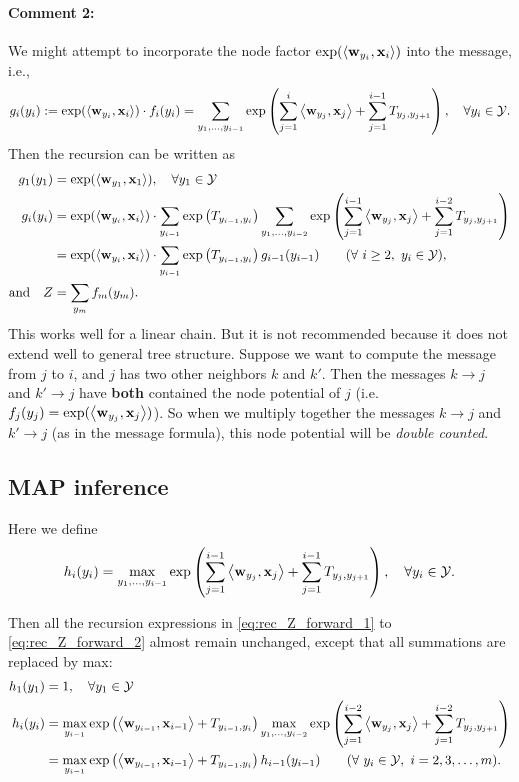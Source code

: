 \documentclass[11pt]{report}
\begin{document}
\paragraph{Comment 2:}
We might attempt to incorporate the node factor $\exp(\left\langle \mathbf{\boldsymbol{w}}_{y_i},\mathbf{\boldsymbol{x}}_i \right\rangle)$ into the message, i.e.,
\begin{align}
	g_i(y_i) := \exp(\left\langle \mathbf{\boldsymbol{w}}_{y_i},\mathbf{\boldsymbol{x}}_i \right\rangle) \cdot f_i(y_i) = \sum_{y_1, \ldots, y_{i-1}} \exp \left(\sum_{j=1}^{i} \left\langle \mathbf{\boldsymbol{w}}_{y_j},\mathbf{\boldsymbol{x}}_j \right\rangle + \sum_{j=1}^{i-1} T_{y_j, y_{j+1}}\right), \quad \forall y_i \in \mathcal{Y}.
\end{align}
Then the recursion can be written as
\begin{align}
	g_1(y_1) &= \exp(\inner{\wvec_{y_1}}{\xvec_1}), \quad \forall y_1 \in \Ycal \\
	g_i(y_i) &= \exp(\inner{\wvec_{y_i}}{\xvec_i}) \cdot \sum_{y_{i-1}} \exp \rbr{T_{y_{i-1}, y_i}}
	\sum_{y_1, \ldots, y_{i-2}} \exp \rbr{\sum_{j=1}^{i-1} \inner{\wvec_{y_j}}{\xvec_j} + \sum_{j=1}^{i-2} T_{y_j, y_{j+1}}} \\
	&= \exp(\inner{\wvec_{y_i}}{\xvec_i}) \cdot \sum_{y_{i-1}} \exp \rbr{T_{y_{i-1}, y_i}}  g_{i-1}(y_{i-1})  \qquad (\forall\ i \ge 2, \ y_i \in \Ycal), \\
	\text{and} \quad Z &= \sum_{y_m} f_m(y_m).
\end{align}
This works well for a linear chain.
But it is not recommended because it does not extend well to general tree structure.
Suppose we want to compute the message from $j$ to $i$, and $j$ has two other neighbors $k$ and $k'$.
Then the messages $k \to j$ and $k' \to j$ have \textbf{both} contained the node potential of $j$ (i.e. $f_j(y_j) = \exp (\left\langle \mathbf{\boldsymbol{w}}_{y_j},\mathbf{\boldsymbol{x}}_j \right\rangle)$).
So when we multiply together the messages $k \to j$ and $k' \to j$ (as in the message formula),
this node potential will be \emph{double counted}.

\subsection{MAP inference}
\label{sec:MAP_formula}
Here we define
\begin{align}
	h_i(y_i) = \max_{y_1, \ldots, y_{i-1}} \exp \left(\sum_{j=1}^{i-1} \left\langle \mathbf{\boldsymbol{w}}_{y_j},\mathbf{\boldsymbol{x}}_j \right\rangle + \sum_{j=1}^{i-1} T_{y_j, y_{j+1}}\right), \quad \forall y_i \in \mathcal{Y}.
\end{align}

Then all the recursion expressions in \eqref{eq:rec_Z_forward_1}	to \eqref{eq:rec_Z_forward_2} almost remain unchanged,
except that all summations are replaced by max:
\begin{align}
	\label{eq:rec_MAP_forward_1}
	h_1(y_1) &= 1, \quad \forall y_1 \in \Ycal \\
	h_i(y_i) &= \max_{y_{i-1}} \exp \rbr{\inner{\wvec_{y_{i-1}}}{\xvec_{i-1}} + T_{y_{i-1}, y_i}}
	\max_{y_1, \ldots, y_{i-2}} \exp \rbr{\sum_{j=1}^{i-2} \inner{\wvec_{y_j}}{\xvec_j} + \sum_{j=1}^{i-2} T_{y_j, y_{j+1}}} \\
	\label{eq:rec_MAP_forward_2}	
	&= \max_{y_{i-1}} \exp \rbr{\inner{\wvec_{y_{i-1}}}{\xvec_{i-1}} + T_{y_{i-1}, y_i}}  h_{i-1}(y_{i-1})  \qquad (\forall\ y_i \in \Ycal, \ i = 2, 3, \ldots, m).
\end{align}
\end{document}
